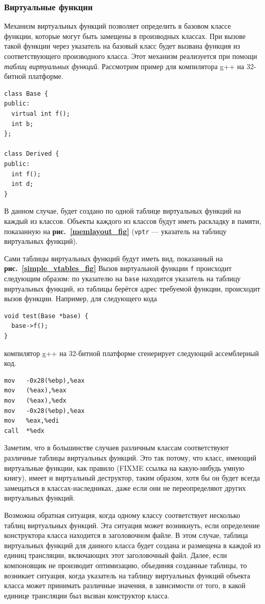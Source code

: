 \documentclass[a4paper,12pt,russian]{article}
\newcommand{\picref}[1]{\textbf{рис.~\ref{#1}}}
\begin{document}
\subsubsection{Виртуальные функции}
\label{virtual_call}
Механизм виртуальных функций позволяет определить в базовом классе функции, которые могут быть замещены в производных классах.
При вызове такой функции через указатель на базовый класс будет вызвана функция из соответствующего производного класса.
Этот механизм реализуется при помощи \emph{таблиц виртуальных функций}.
Рассмотрим пример для компилятора g++ на 32-битной платформе.
\begin{lstlisting}
class Base {
public:
  virtual int f();
  int b;
};

class Derived {
public:
  int f();
  int d;
}
\end{lstlisting}
В данном случае, будет создано по одной таблице виртуальных функций на каждый из классов.
Объекты каждого из классов будут иметь раскладку в памяти, показанную на \picref{memlayout_fig} (\texttt{vptr} --- указатель на таблицу виртуальных функций).

Сами таблицы виртуальных функций будут иметь вид, показанный на \picref{simple_vtables_fig}
Вызов виртуальной функции \texttt{f} происходит следующим образом: по указателю на \texttt{base} находится указатель на таблицу виртуальных функций, из таблицы берётся адрес требуемой функции, происходит вызов функции.
Например, для следующего кода
\begin{lstlisting}
void test(Base *base) {
  base->f();
}
\end{lstlisting}
компилятор g++ на 32-битной платформе сгенерирует следующий ассемблерный код.
\begin{lstlisting}
mov   -0x28(%ebp),%eax
mov   (%eax),%eax
mov   (%eax),%edx
mov   -0x28(%ebp),%eax
mov   %eax,%edi
call  *%edx
\end{lstlisting}


Заметим, что в большинстве случаев различным классам соответствуют различные таблицы виртуальных функций.
Это так потому, что класс, имеющий виртуальные функции, как правило (FIXME ссылка на какую-нибудь умную книгу), имеет и виртуальный деструктор, таким образом, хотя бы он будет всегда замещаться в классах-наследниках, даже если они не переопределяют других виртуальных функций.

Возможна обратная ситуация, когда одному классу соответствует несколько таблиц виртуальных функций.
Эта ситуация может возникнуть, если определение конструктора класса находится в заголовочном файле.
В этом случае, таблица виртуальных функций для данного класса будет создана и размещена в каждой из единиц трансляции, включающих этот заголовочный файл.
Далее, если компоновщик не производит оптимизацию, объединяя созданные таблицы, то возникает ситуация, когда указатель на таблицу виртуальных функций объекта класса может принимать различные значения, в зависимости от того, в какой единице трансляции был вызван конструктор класса.
\end{document}
